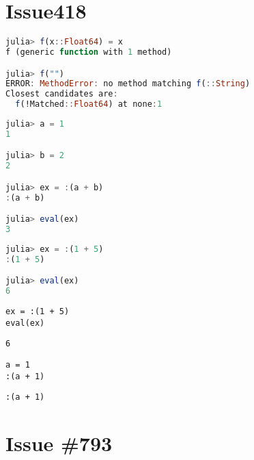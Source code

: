 \chapter{Issue418}



\label{12101809483198928652}{}



\begin{lstlisting}[language=julia, style=jlcodestyle]
julia> f(x::Float64) = x
f (generic function with 1 method)

julia> f("")
ERROR: MethodError: no method matching f(::String)
Closest candidates are:
  f(!Matched::Float64) at none:1
\end{lstlisting}




\begin{lstlisting}[language=julia, style=jlcodestyle]
julia> a = 1
1

julia> b = 2
2

julia> ex = :(a + b)
:(a + b)

julia> eval(ex)
3
\end{lstlisting}




\begin{lstlisting}[language=julia, style=jlcodestyle]
julia> ex = :(1 + 5)
:(1 + 5)

julia> eval(ex)
6
\end{lstlisting}




\begin{lstlisting}[]
ex = :(1 + 5)
eval(ex)
\end{lstlisting}


\begin{lstlisting}[]
6
\end{lstlisting}




\begin{lstlisting}[]
a = 1
:(a + 1)
\end{lstlisting}


\begin{lstlisting}[]
:(a + 1)
\end{lstlisting}



\chapter{Issue \#793}




